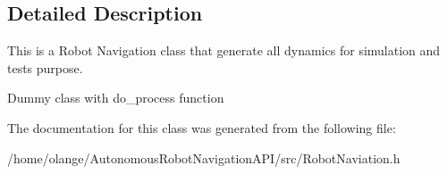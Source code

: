 \subsection{Detailed Description}
This is a Robot Navigation class that generate all dynamics for simulation and tests purpose. 

Dummy class with do\+\_\+process function 

The documentation for this class was generated from the following file\+:\begin{DoxyCompactItemize}
\item 
/home/olange/\+Autonomous\+Robot\+Navigation\+A\+P\+I/src/Robot\+Naviation.\+h\end{DoxyCompactItemize}

